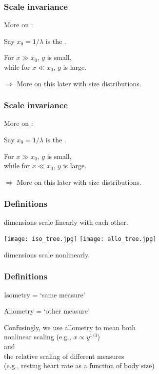 \begin{frame}
  \frametitle{Scale invariance}

More on :

Say $x_0 = 1/\lambda$ is the .

For $x \gg x_0$, $y$ is small,\\
while for $x \ll x_0$, $y$ is large.

\inv

$\Rightarrow$ More on this later with size distributions.

\end{frame}

\begin{frame}
  \frametitle{Scale invariance}

More on :

Say $x_0 = 1/\lambda$ is the .

For $x \gg x_0$, $y$ is small,\\
while for $x \ll x_0$, $y$ is large.

$\Rightarrow$ More on this later with size distributions.



\end{frame}

\begin{frame}
  \frametitle{Definitions}

 dimensions scale linearly with each other.

\begin{center}
\texttt{[image: iso\_tree.jpg]}
\hfill
\texttt{[image: allo\_tree.jpg]}
\end{center}

\mbox{} \hfill {} dimensions scale nonlinearly.

\end{frame}

\begin{frame}
  \frametitle{Definitions}

Isometry = `same measure'

Allometry = `other measure'

\inv

Confusingly, we use allometry to mean both\\
 nonlinear scaling (e.g., $x \propto y^{1/3}$)\\
and\\
 the relative scaling of different measures\\
(e.g., resting heart rate as a function of body size)

\end{frame}

